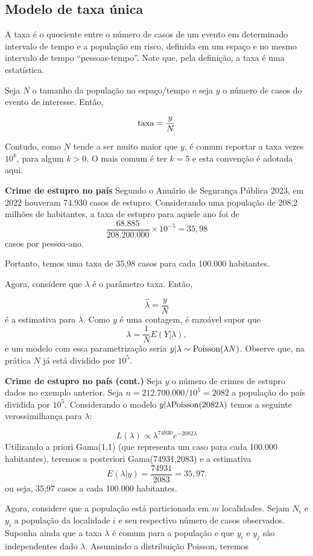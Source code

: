 \documentclass[
  letterpaper,
  DIV=11,
  numbers=noendperiod]{scrreprt}
\theoremstyle{definition}
\theoremstyle{plain}
\theoremstyle{definition}
\theoremstyle{remark}
\begin{document}
\subsection{Modelo de taxa única}\label{modelo-de-taxa-uxfanica}

A taxa é o quociente entre o número de casos de um evento em determinado
intervalo de tempo e a população em risco, definida em um espaço e no
mesmo intervalo de tempo ``pessoas-tempo''. Note que, pela definição, a
taxa é uma estatística.

Seja \(N\) o tamanho da população no espaço/tempo e seja \(y\) o número
de casos do evento de interesse. Então,

\[\hbox{taxa} = \frac{y}{N}\]

Contudo, como \(N\) tende a ser muito maior que \(y\), é comum reportar
a taxa vezes \(10^k\), para algum \(k>0\). O mais comum é ter \(k=5\) e
esta convenção é adotada aqui.

\label{exm}
\textbf{Crime de estupro no país} Segundo o Anuário de Segurança Pública
2023, em 2022 houveram 74.930 casos de estupro. Considerando uma
população de 208,2 milhões de habitantes, a taxa de estupro para aquele
ano foi de \[\frac{68.885}{208.200.000}\times 10^{-5}=35,98\] casos por
pessoa-ano.

Portanto, temos uma taxa de 35,98 casos para cada 100.000 habitantes.

Agora, considere que \(\lambda\) é o parâmetro taxa. Então,

\[\hat{\lambda}=\frac{y}{N}\] é a estimativa para \(\lambda\). Como
\(y\) é uma contagem, é razoável supor que
\[\lambda =\frac{1}{N}E(Y|\lambda),\] e um modelo com essa
parametrização seria \(y|\lambda\sim\hbox{Poisson}(\lambda N)\). Observe
que, na prática \(N\) já está dividido por \(10^5\).

\label{exm}
\textbf{Crime de estupro no país (cont.)} Seja \(y\) o número de crimes
de estupro dados no exemplo anterior. Seja \(n=212.700.000/10^5=2082\) a
população do país dividida por \(10^5\). Considerando o modelo
\(y|\lambda\hbox{Poisson}(2082\lambda)\) temos a seguinte
verossimilhança para \(\lambda\):

\[L(\lambda)\propto \lambda^{74930}e^{-2082\lambda  }\] Utilizando a
priori Gama(1,1) (que representa um caso para cada 100.000 habitantes),
teremos a posteriori Gama(74931,2083) e a estimativa
\[E(\lambda|y)=\frac{74931}{2083}=35,97.\] ou seja, 35,97 casos a cada
100.000 habitantes.

Agora, considere que a população está particionada em \(m\) localidades.
Sejam \(N_i\) e \(y_i\) a população da localidade \(i\) e seu respectivo
número de casos observados. Suponha ainda que a taxa \(\lambda\) é comum
para a população e que \(y_i\) e \(y_j\) são independentes dado
\(\lambda\). Assumindo a distribuição Poisson, teremos
\end{document}
